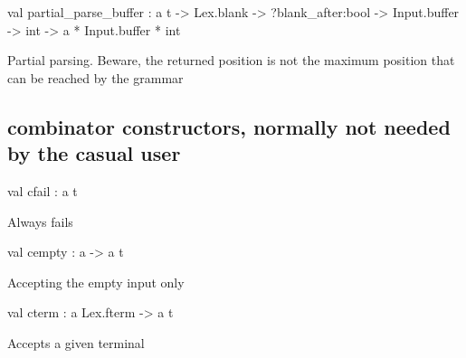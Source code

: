 \documentclass[11pt]{article}
\begin{document}
\label{val:Combinator.partial-underscoreparse-underscorebuffer}\begin{ocamldoccode}
val partial_parse_buffer :
  {\textquotesingle}a t ->
  Lex.blank ->
  ?blank_after:bool -> Input.buffer -> int -> {\textquotesingle}a * Input.buffer * int
\end{ocamldoccode}
\begin{ocamldocdescription}
Partial parsing. Beware, the returned position is not the maximum position
    that can be reached by the grammar


\end{ocamldocdescription}




\subsection{combinator constructors, normally not needed by the casual user }




\label{val:Combinator.cfail}\begin{ocamldoccode}
val cfail : {\textquotesingle}a t
\end{ocamldoccode}
\begin{ocamldocdescription}
Always fails


\end{ocamldocdescription}




\label{val:Combinator.cempty}\begin{ocamldoccode}
val cempty : {\textquotesingle}a -> {\textquotesingle}a t
\end{ocamldoccode}
\begin{ocamldocdescription}
Accepting the empty input only


\end{ocamldocdescription}




\label{val:Combinator.cterm}\begin{ocamldoccode}
val cterm : {\textquotesingle}a Lex.fterm -> {\textquotesingle}a t
\end{ocamldoccode}
\begin{ocamldocdescription}
Accepts a given terminal


\end{ocamldocdescription}
\end{document}
